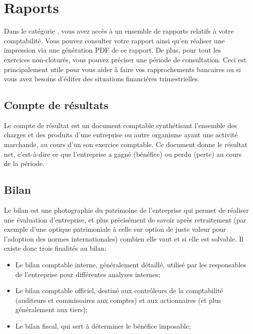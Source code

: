 \documentclass[a4paper,10pt,oneside,french]{sphinxmanual}
\begin{document}
\section{Raports}
\label{\detokenize{accounting/reporting::doc}}\label{\detokenize{accounting/reporting:raports}}
Dans le catégorie , vous avez accès à un ensemble de rapports relatifs à votre comptabilité.
Vous pouvez consulter votre rapport ainsi qu’en réaliser une impression via une génération PDF de ce rapport.
De plus, pour tout les exercices non-cloturés, vous pouvez préciser une période de consultation.
Ceci est principalement utile pour vous aider à faire vos rapprochements bancaires ou si vous avez besoins d’éditer des situations financiéres trimestrielles.


\subsection{Compte de résultats}
\label{\detokenize{accounting/reporting:compte-de-resultats}}
Le compte de résultat est un document comptable synthétisant l’ensemble des charges et des produits d’une entreprise ou autre organisme ayant une activité marchande, au cours d’un son exercice comptable.
Ce document donne le résultat net, c’est-à-dire ce que l’entreprise a gagné (bénéfice) ou perdu (perte) au cours de la période.


\subsection{Bilan}
\label{\detokenize{accounting/reporting:bilan}}
Le bilan est une photographie du patrimoine de l’entreprise qui permet de réaliser une évaluation d’entreprise, et plus précisément de savoir après retraitement (par exemple d’une optique patrimoniale à celle sur option de juste valeur pour l’adoption des normes internationales) combien elle vaut et si elle est solvable.
Il existe donc trois finalités au bilan:
\begin{itemize}
\item {} 
Le bilan comptable interne, généralement détaillé, utilisé par les responsables de l’entreprise pour différentes analyses internes;

\item {} 
Le bilan comptable officiel, destiné aux contrôleurs de la comptabilité (auditeurs et commissaires aux comptes) et aux actionnaires (et plus généralement aux tiers);

\item {} 
Le bilan fiscal, qui sert à déterminer le bénéfice imposable;

\end{itemize}
\end{document}
